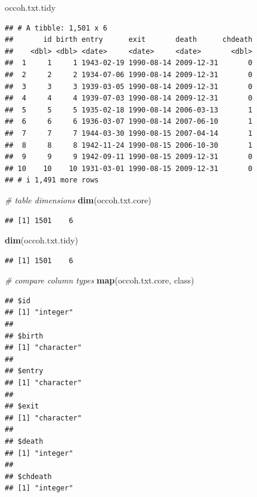 \documentclass[
]{book}
\newenvironment{Shaded}{\begin{snugshade}}{\end{snugshade}}
\newcommand{\CommentTok}[1]{\textcolor[rgb]{0.56,0.35,0.01}{\textit{#1}}}
\newcommand{\FunctionTok}[1]{\textcolor[rgb]{0.13,0.29,0.53}{\textbf{#1}}}
\newcommand{\NormalTok}[1]{#1}
\theoremstyle{definition}
\theoremstyle{definition}
\theoremstyle{definition}
\theoremstyle{definition}
\theoremstyle{remark}
\begin{document}
\begin{Shaded}
\begin{Highlighting}[]
\NormalTok{occoh.txt.tidy}
\end{Highlighting}
\end{Shaded}

\begin{verbatim}
## # A tibble: 1,501 x 6
##       id birth entry      exit       death      chdeath
##    <dbl> <dbl> <date>     <date>     <date>       <dbl>
##  1     1     1 1943-02-19 1990-08-14 2009-12-31       0
##  2     2     2 1934-07-06 1990-08-14 2009-12-31       0
##  3     3     3 1939-03-05 1990-08-14 2009-12-31       0
##  4     4     4 1939-07-03 1990-08-14 2009-12-31       0
##  5     5     5 1935-02-18 1990-08-14 2006-03-13       1
##  6     6     6 1936-03-07 1990-08-14 2007-06-10       1
##  7     7     7 1944-03-30 1990-08-15 2007-04-14       1
##  8     8     8 1942-11-24 1990-08-15 2006-10-30       1
##  9     9     9 1942-09-11 1990-08-15 2009-12-31       0
## 10    10    10 1931-03-01 1990-08-15 2009-12-31       0
## # i 1,491 more rows
\end{verbatim}

\begin{Shaded}
\begin{Highlighting}[]
\CommentTok{\# table dimensions}
\FunctionTok{dim}\NormalTok{(occoh.txt.core)}
\end{Highlighting}
\end{Shaded}

\begin{verbatim}
## [1] 1501    6
\end{verbatim}

\begin{Shaded}
\begin{Highlighting}[]
\FunctionTok{dim}\NormalTok{(occoh.txt.tidy)}
\end{Highlighting}
\end{Shaded}

\begin{verbatim}
## [1] 1501    6
\end{verbatim}

\begin{Shaded}
\begin{Highlighting}[]
\CommentTok{\# compare column types}
\FunctionTok{map}\NormalTok{(occoh.txt.core, class)}
\end{Highlighting}
\end{Shaded}

\begin{verbatim}
## $id
## [1] "integer"
## 
## $birth
## [1] "character"
## 
## $entry
## [1] "character"
## 
## $exit
## [1] "character"
## 
## $death
## [1] "integer"
## 
## $chdeath
## [1] "integer"
\end{verbatim}
\end{document}
